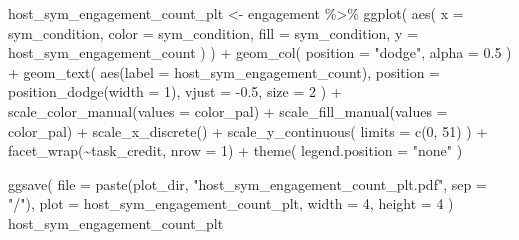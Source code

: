 \documentclass[
]{book}
\newenvironment{Shaded}{\begin{snugshade}}{\end{snugshade}}
\newcommand{\AttributeTok}[1]{\textcolor[rgb]{0.77,0.63,0.00}{#1}}
\newcommand{\DecValTok}[1]{\textcolor[rgb]{0.00,0.00,0.81}{#1}}
\newcommand{\FloatTok}[1]{\textcolor[rgb]{0.00,0.00,0.81}{#1}}
\newcommand{\FunctionTok}[1]{\textcolor[rgb]{0.00,0.00,0.00}{#1}}
\newcommand{\NormalTok}[1]{#1}
\newcommand{\OtherTok}[1]{\textcolor[rgb]{0.56,0.35,0.01}{#1}}
\newcommand{\SpecialCharTok}[1]{\textcolor[rgb]{0.00,0.00,0.00}{#1}}
\newcommand{\StringTok}[1]{\textcolor[rgb]{0.31,0.60,0.02}{#1}}
\begin{document}
\begin{Shaded}
\begin{Highlighting}[]
\NormalTok{host\_sym\_engagement\_count\_plt }\OtherTok{\textless{}{-}}\NormalTok{ engagement }\SpecialCharTok{\%\textgreater{}\%}
  \FunctionTok{ggplot}\NormalTok{(}
    \FunctionTok{aes}\NormalTok{(}
      \AttributeTok{x =}\NormalTok{ sym\_condition,}
      \AttributeTok{color =}\NormalTok{ sym\_condition,}
      \AttributeTok{fill =}\NormalTok{ sym\_condition,}
      \AttributeTok{y =}\NormalTok{ host\_sym\_engagement\_count}
\NormalTok{    )}
\NormalTok{  ) }\SpecialCharTok{+}
  \FunctionTok{geom\_col}\NormalTok{(}
    \AttributeTok{position =} \StringTok{"dodge"}\NormalTok{,}
    \AttributeTok{alpha =} \FloatTok{0.5}
\NormalTok{  ) }\SpecialCharTok{+}
  \FunctionTok{geom\_text}\NormalTok{(}
    \FunctionTok{aes}\NormalTok{(}\AttributeTok{label =}\NormalTok{ host\_sym\_engagement\_count),}
    \AttributeTok{position =} \FunctionTok{position\_dodge}\NormalTok{(}\AttributeTok{width =} \DecValTok{1}\NormalTok{),}
    \AttributeTok{vjust =} \SpecialCharTok{{-}}\FloatTok{0.5}\NormalTok{,}
    \AttributeTok{size =} \DecValTok{2}
\NormalTok{  ) }\SpecialCharTok{+}
  \FunctionTok{scale\_color\_manual}\NormalTok{(}\AttributeTok{values =}\NormalTok{ color\_pal) }\SpecialCharTok{+}
  \FunctionTok{scale\_fill\_manual}\NormalTok{(}\AttributeTok{values =}\NormalTok{ color\_pal) }\SpecialCharTok{+}
  \FunctionTok{scale\_x\_discrete}\NormalTok{() }\SpecialCharTok{+}
  \FunctionTok{scale\_y\_continuous}\NormalTok{(}
    \AttributeTok{limits =} \FunctionTok{c}\NormalTok{(}\DecValTok{0}\NormalTok{, }\DecValTok{51}\NormalTok{)}
\NormalTok{  ) }\SpecialCharTok{+}
  \FunctionTok{facet\_wrap}\NormalTok{(}\SpecialCharTok{\textasciitilde{}}\NormalTok{task\_credit, }\AttributeTok{nrow =} \DecValTok{1}\NormalTok{) }\SpecialCharTok{+}
  \FunctionTok{theme}\NormalTok{(}
    \AttributeTok{legend.position =} \StringTok{"none"}
\NormalTok{  )}

\FunctionTok{ggsave}\NormalTok{(}
  \AttributeTok{file =} \FunctionTok{paste}\NormalTok{(plot\_dir, }\StringTok{"host\_sym\_engagement\_count\_plt.pdf"}\NormalTok{, }\AttributeTok{sep =} \StringTok{"/"}\NormalTok{),}
  \AttributeTok{plot =}\NormalTok{ host\_sym\_engagement\_count\_plt,}
  \AttributeTok{width =} \DecValTok{4}\NormalTok{,}
  \AttributeTok{height =} \DecValTok{4}
\NormalTok{)}
\NormalTok{host\_sym\_engagement\_count\_plt}
\end{Highlighting}
\end{Shaded}
\end{document}
